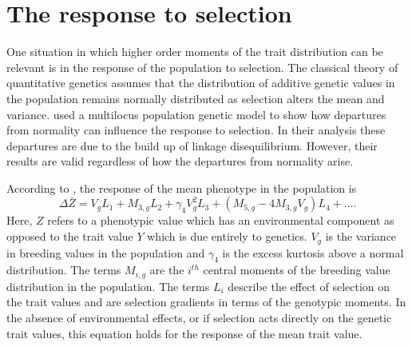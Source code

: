 \documentclass{article}
\begin{document}
\section{The response to selection}
One situation in which higher order moments of the trait distribution can be
relevant is in the response of the population to selection. The classical theory
of quantitative genetics assumes that the distribution of additive genetic
values in the population remains normally distributed as selection alters the
mean and variance. \citet{Turelli1990} used a multilocus population genetic
model to show how departures from normality can influence the response to
selection. In their analysis these departures are due to the build up of linkage
disequilibrium. However, their results are valid regardless of how the
departures from normality arise.

According to \citet{Turelli1990}, the response of the mean phenotype in the
population is 
\begin{equation}
  \label{eq:selresp}
  \Delta \bar{Z} = V_gL_1 + M_{3,g}L_2 + \gamma_4V^2_gL_3 +
  \left( M_{5,g}-4M_{3,g}V_g\right)L_4 + \ldots.
\end{equation}
Here, $Z$ refers to a phenotypic value which has an environmental component as
opposed to the trait value $Y$ which is due entirely to genetics. $V_g$ is the
variance in breeding values in the population and $\gamma_4$ is the excess
kurtosis above a normal distribution. The terms $M_{i,g}$ are the $i^{th}$
central moments of the breeding value distribution in the population. The terms
$L_i$ describe the effect of selection on the trait values and are selection
gradients in terms of the genotypic moments. In the absence of environmental
effects, or if selection acts directly on the genetic trait values, this
equation holds for the response of the mean trait value.
\end{document}
